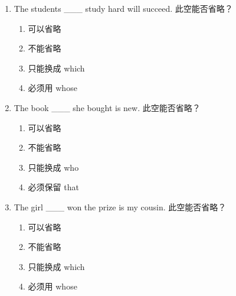 \documentclass[11pt,a4paper]{ctexart}
\begin{document}
\begin{enumerate}[leftmargin=*,itemsep=4pt]
\begin{enumerate}[label=\Alph*.,leftmargin=2em,itemsep=1pt,topsep=2pt]
\item 不能省略
\item 只能换成 who
\item 必须保留 which
\end{enumerate}
\item The students \_\_\_ study hard will succeed. 此空能否省略？
\begin{enumerate}[label=\Alph*.,leftmargin=2em,itemsep=1pt,topsep=2pt]
\item 可以省略
\item 不能省略
\item 只能换成 which
\item 必须用 whose
\end{enumerate}
\item The book \_\_\_ she bought is new. 此空能否省略？
\begin{enumerate}[label=\Alph*.,leftmargin=2em,itemsep=1pt,topsep=2pt]
\item 可以省略
\item 不能省略
\item 只能换成 who
\item 必须保留 that
\end{enumerate}
\item The girl \_\_\_ won the prize is my cousin. 此空能否省略？
\begin{enumerate}[label=\Alph*.,leftmargin=2em,itemsep=1pt,topsep=2pt]
\item 可以省略
\item 不能省略
\item 只能换成 which
\item 必须用 whose
\end{enumerate}
\end{enumerate}
\end{document}

